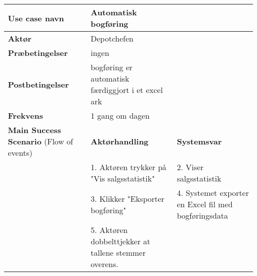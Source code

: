 \begin{longtable}{ |p{120pt}|p{120pt}|p{120pt}| }
    \hline
    \textbf{Use case navn} & Automatisk bogføring & \\
    \hline
    \textbf{Aktør} & Depotchefen & \\
    \hline
    \textbf{Præbetingelser} & ingen & \\
    \hline
    \textbf{Postbetingelser} & bogføring er automatisk færdiggjort i et excel ark & \\
    \hline
    \textbf{Frekvens} & 1 gang om dagen & \\
    \hline
    \textbf{Main Success Scenario} (Flow of events) & \textbf{Aktørhandling} & \textbf{Systemsvar} \\
    \hline
    & 1. Aktøren trykker på "Vis salgsstatistik" & 2. Viser salgsstatistik \\
    \hline
    & 3. Klikker "Eksporter bogføring" & 4. Systemet exporter en Excel fil med bogføringsdata \\
    \hline
    & 5. Aktøren dobbelttjekker at tallene stemmer overens. & \\
\end{longtable}